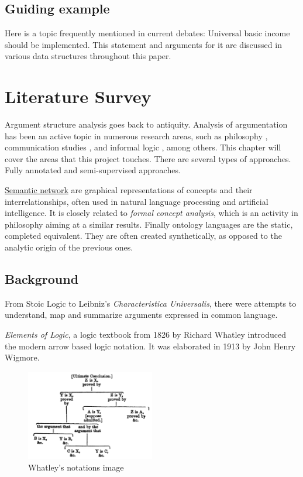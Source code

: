 \documentclass{report}
\begin{document}
{\section{Guiding example}

Here is a topic frequently mentioned in current debates: Universal basic income should be implemented.
This statement and arguments for it are discussed in various data structures throughout this paper.

\chapter{Literature Survey}
Argument structure analysis goes back to antiquity. \cite{angelelli_techniques_1970}
Analysis of argumentation has been an active topic in numerous research areas, such as philosophy \cite{van_eemeren_systematic_2003}, communication studies \cite{mercier_why_2011}, and informal logic \cite{blair_informal_2000}, among others. This chapter will cover the areas that this project touches. There are several types of approaches. Fully annotated and semi-supervised approaches.

\href{https:\\en.wikipedia.org/wiki/Semantic_network}{Semantic network} are graphical representations of concepts and their interrelationships, often used in natural language processing and artificial intelligence. It is closely related to \textit{formal concept analysis}, which is an activity in philosophy aiming at a similar results. Finally ontology languages are the static, completed equivalent. They are often created synthetically, as opposed to the analytic origin of the previous ones.

\section{Background}
From Stoic Logic to Leibniz's \textit{Characteristica Universalis}, there were attempts to understand, map and summarize arguments expressed in common language. 

\cite{woltzenlogel_paleo_leibnizs_2016}
\textit{Elements of Logic}, a logic textbook from 1826 by Richard Whatley introduced the modern arrow based logic notation. It was elaborated in 1913 by John Henry Wigmore.
\cite{wigmore_principles_1913}

\begin{figure}[h]
    \centering
    \includegraphics[width=0.5\textwidth]{./images/Whatley.png}
    \caption{Whatley's notations image}
\end{figure}


}
\end{document}
